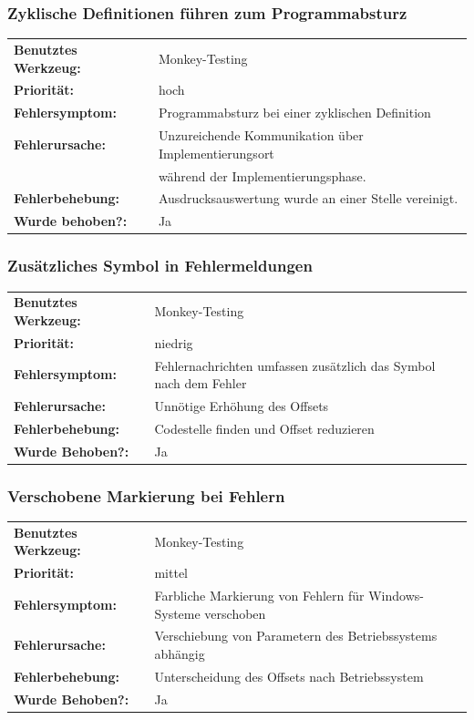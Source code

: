 \documentclass{article}
\begin{document}
\subsubsection*{Zyklische Definitionen führen zum Programmabsturz}
\begin{tabular}{ll}
    \textbf{Benutztes Werkzeug:} & Monkey-Testing\\
    \textbf{Priorität:} & hoch\\
    \textbf{Fehlersymptom:} & Programmabsturz bei einer zyklischen Definition\\
    \textbf{Fehlerursache:} & Unzureichende Kommunikation über Implementierungsort\\
    & während der Implementierungsphase. \\
    \textbf{Fehlerbehebung:} & Ausdrucksauswertung wurde an einer Stelle vereinigt.\\
    \textbf{Wurde behoben?:} & Ja\\
\end{tabular}

\subsubsection*{Zusätzliches Symbol in Fehlermeldungen}
\begin{tabular}{ll}
    \textbf{Benutztes Werkzeug:} & Monkey-Testing\\
    \textbf{Priorität:} & niedrig\\
    \textbf{Fehlersymptom:} & Fehlernachrichten umfassen zusätzlich das Symbol nach dem Fehler\\
    \textbf{Fehlerursache:} & Unnötige Erhöhung des Offsets\\
    \textbf{Fehlerbehebung:} & Codestelle finden und Offset reduzieren\\
    \textbf{Wurde Behoben?:} & Ja\\
\end{tabular}

\subsubsection*{Verschobene Markierung bei Fehlern}
\begin{tabular}{ll}
    \textbf{Benutztes Werkzeug:} & Monkey-Testing\\
    \textbf{Priorität:} & mittel\\
    \textbf{Fehlersymptom:} & Farbliche Markierung von Fehlern für Windows-Systeme verschoben\\
    \textbf{Fehlerursache:} & Verschiebung von Parametern des Betriebssystems abhängig\\
    \textbf{Fehlerbehebung:} & Unterscheidung des Offsets nach Betriebssystem\\
    \textbf{Wurde Behoben?:} & Ja\\
\end{tabular}
\end{document}
